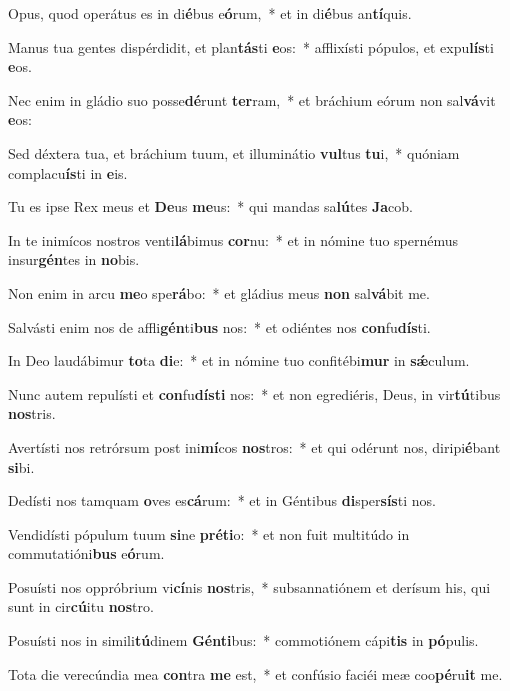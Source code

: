 \item Opus, quod operátus es in di\textbf{é}bus e\textbf{ó}rum,~* et in di\textbf{é}bus an\textbf{tí}quis.
\item Manus tua gentes dispérdidit, et plan\textbf{tás}ti \textbf{e}os:~* afflixísti pópulos, et expu\textbf{lís}ti \textbf{e}os.
\item Nec enim in gládio suo posse\textbf{dé}runt \textbf{ter}ram,~* et bráchium eórum non sal\textbf{vá}vit \textbf{e}os:
\item Sed déxtera tua, et bráchium tuum, et illuminátio \textbf{vul}tus \textbf{tu}i,~* quóniam complacu\textbf{ís}ti in \textbf{e}is.
\item Tu es ipse Rex meus et \textbf{De}us \textbf{me}us:~* qui mandas sa\textbf{lú}tes \textbf{Ja}cob.
\item In te inimícos nostros venti\textbf{lá}bimus \textbf{cor}nu:~* et in nómine tuo spernémus insur\textbf{gén}tes in \textbf{no}bis.
\item Non enim in arcu \textbf{me}o spe\textbf{rá}bo:~* et gládius meus \textbf{non} sal\textbf{vá}bit me.
\item Salvásti enim nos de affli\textbf{gén}ti\textbf{bus} nos:~* et odiéntes nos \textbf{con}fu\textbf{dís}ti.
\item In Deo laudábimur \textbf{to}ta \textbf{di}e:~* et in nómine tuo confitébi\textbf{mur} in \textbf{sǽ}culum.
\item Nunc autem repulísti et \textbf{con}fu\textbf{dís}\textbf{ti} nos:~* et non egrediéris, Deus, in vir\textbf{tú}tibus \textbf{nos}tris.
\item Avertísti nos retrórsum post ini\textbf{mí}cos \textbf{nos}tros:~* et qui odérunt nos, diripi\textbf{é}bant \textbf{si}bi.
\item Dedísti nos tamquam \textbf{o}ves es\textbf{cá}rum:~* et in Géntibus \textbf{di}sper\textbf{sís}ti nos.
\item Vendidísti pópulum tuum \textbf{si}ne \textbf{pré}\textbf{ti}o:~* et non fuit multitúdo in commutatióni\textbf{bus} e\textbf{ó}rum.
\item Posuísti nos oppróbrium vi\textbf{cí}nis \textbf{nos}tris,~* subsannatiónem et derísum his, qui sunt in cir\textbf{cú}itu \textbf{nos}tro.
\item Posuísti nos in simili\textbf{tú}dinem \textbf{Gén}\textbf{ti}bus:~* commotiónem cápi\textbf{tis} in \textbf{pó}pulis.
\item Tota die verecúndia mea \textbf{con}tra \textbf{me} est,~* et confúsio faciéi meæ coo\textbf{pé}ru\textbf{it} me.
